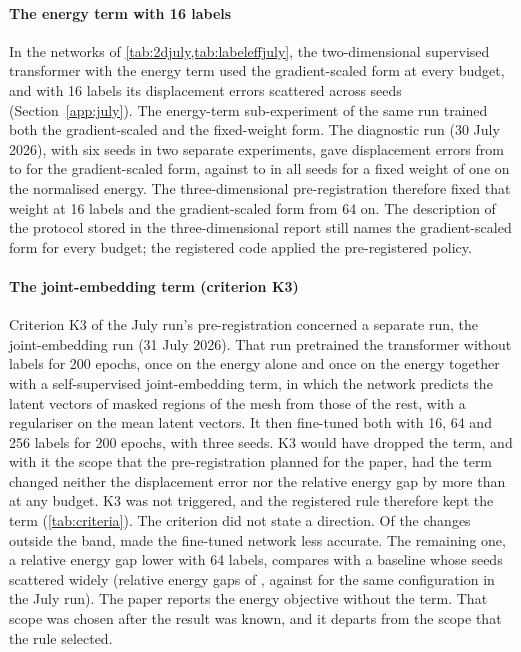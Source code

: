 \paragraph{The energy term with 16 labels}
In the networks of \cref{tab:2djuly,tab:labeleffjuly}, the two-dimensional supervised
transformer with the energy term used the gradient-scaled form at every budget, and with 16
labels its displacement errors scattered across seeds (Section~\ref{app:july}). The energy-term
sub-experiment of the same run trained both the gradient-scaled and the
fixed-weight form. The diagnostic run (30 July 2026), with six seeds in two separate
experiments, gave displacement errors from \numDiagScaledMin{} to \numDiagScaledMax{} for
the gradient-scaled form, against \numDiagFixedMin{} to \numDiagFixedMax{} in all
\numDiagFixedSeeds{} seeds for a fixed weight of one on the normalised energy. The
three-dimensional pre-registration therefore fixed that weight at 16 labels and the
gradient-scaled form from 64 on. The description of the protocol stored in the
three-dimensional report still names the gradient-scaled form for every budget; the
registered code applied the pre-registered policy.

\paragraph{The joint-embedding term (criterion K3)}
Criterion K3 of the July run's pre-registration concerned a separate run, the
joint-embedding run (31 July 2026). That run pretrained the transformer without labels for
200 epochs, once on the energy alone and once on the energy together with a self-supervised
joint-embedding term, in which the network predicts the latent vectors of masked regions of
the mesh from those of the rest, with a regulariser on the mean latent vectors. It then fine-tuned both
with 16, 64 and 256 labels for 200 epochs, with three seeds. K3 would have dropped the term,
and with it the scope that the pre-registration planned for the paper, had the term changed
neither the displacement error nor the relative energy gap by more than \numKthreeBand{} at
any budget. K3 was not triggered, and the registered rule therefore kept the term
(\cref{tab:criteria}). The criterion did not state a direction. Of the \numKthreeOutside{}
changes outside the band, \numKthreeWorse{} made the fine-tuned network less accurate. The remaining one, a relative energy gap \numKthreeGain{} lower with 64 labels, compares with a
baseline whose seeds scattered widely (relative energy gaps of \numKthreeBaseSeeds{},
against \numKthreeBaseRef{} for the same configuration in the July run). The paper reports
the energy objective without the term. That scope was chosen after the result was known, and
it departs from the scope that the rule selected.

